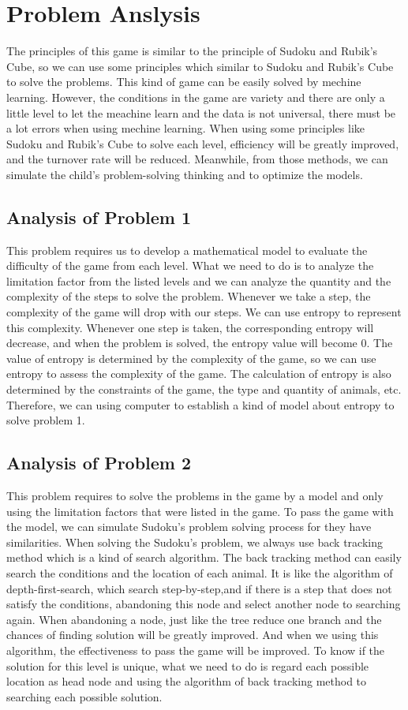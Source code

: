 \documentclass[12pt,a4paper,]{article}
\begin{document}
\section{Problem Anslysis}
The principles of this game is similar to the principle of Sudoku and Rubik's Cube, so we can use some principles which similar to Sudoku and Rubik's Cube to solve the problems. This kind of game can be easily solved by mechine learning. However, the conditions in the game are variety and there are only a little level to let the meachine learn and the data is not universal, there must be a lot errors when using mechine learning.  When using some principles like Sudoku and Rubik's Cube to solve each level, efficiency will be greatly improved, and the turnover rate will be reduced. Meanwhile, from those methods, we can simulate the child's problem-solving thinking and to optimize the models.

\subsection{Analysis of Problem 1}

This problem requires us to develop a mathematical model to evaluate the difficulty of the game from each level. What we need to do is to analyze the limitation factor from the listed levels and we can analyze the quantity and the complexity of the steps to solve the problem. Whenever we take a step, the complexity of the game will drop with our steps. We can use entropy to represent this complexity. Whenever one step is taken, the corresponding entropy will decrease, and when the problem is solved, the entropy value will become 0.  The value of entropy is determined by the complexity of the game, so we can use entropy to assess the complexity of the game. The calculation of entropy is also determined by the constraints of the game, the type and quantity of animals, etc. Therefore, we can using computer to establish a kind of model about entropy to solve problem 1.

\subsection{Analysis of Problem 2}
This problem requires to solve the problems in the game by a model and only using the limitation factors that were listed in the game. To pass the game with the model, we can simulate Sudoku's problem solving process for they have similarities. When solving the Sudoku's problem, we always use back tracking method which is a kind of search algorithm.  The back tracking method can easily search the conditions and the location of each animal. It is like the algorithm of depth-first-search, which search step-by-step,and if there is a step that does not satisfy the conditions, abandoning this node and select another node to searching again. When abandoning a node, just like the tree  reduce one branch and the chances of finding solution will be greatly improved. And when we using this algorithm, the effectiveness to pass the game will  be improved. To know if the solution for this level is unique, what we need to do is regard each possible location as head node and using the algorithm of back tracking method to searching each possible solution.
\end{document}
